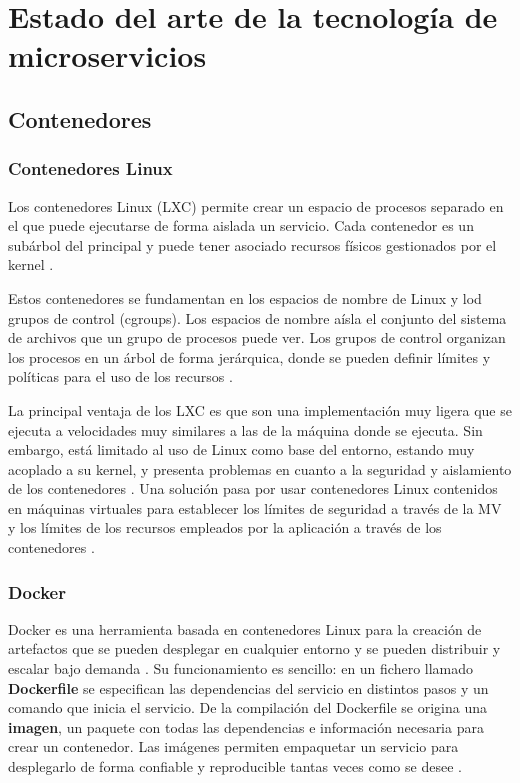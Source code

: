 \documentclass[11pt,spanish,listoffigures]{tfgetsinf}
\begin{document}
\chapter{Estado del arte de la tecnología de microservicios}

\section{Contenedores}

\subsection{Contenedores Linux}

Los contenedores Linux (LXC) permite crear un espacio de procesos separado en el que puede ejecutarse de forma aislada un servicio. Cada contenedor es un subárbol del principal y puede tener asociado recursos físicos gestionados por el kernel \cite{Newman2015a}.

Estos contenedores se fundamentan en los espacios de nombre de Linux y lod grupos de control (cgroups). Los espacios de nombre aísla el conjunto del sistema de archivos que un grupo de procesos puede ver. Los grupos de control organizan los procesos en un árbol de forma jerárquica, donde se pueden definir límites y políticas para el uso de los recursos \cite{Amaral2016}.

La principal ventaja de los LXC es que son una implementación muy ligera que se ejecuta a velocidades muy similares a las de la máquina donde se ejecuta. Sin embargo, está limitado al uso de Linux como base del entorno, estando muy acoplado a su kernel, y presenta problemas en cuanto a la seguridad y aislamiento de los contenedores \cite{Dua2014}. Una solución pasa por usar contenedores Linux contenidos en máquinas virtuales para establecer los límites de seguridad a través de la MV y los límites de los recursos empleados por la aplicación a través de los contenedores \cite{DeAlfonso2017}.

\subsection{Docker}

Docker es una herramienta basada en contenedores Linux para la creación de artefactos que se pueden desplegar en cualquier entorno y se pueden distribuir y escalar bajo demanda \cite{Matthias}. Su funcionamiento es sencillo: en un fichero llamado \textbf{Dockerfile} se especifican las dependencias del servicio en distintos pasos y un comando que inicia el servicio. De la compilación del Dockerfile se origina una \textbf{imagen}, un paquete con todas las dependencias e información necesaria para crear un contenedor. Las imágenes permiten empaquetar un servicio para desplegarlo de forma confiable y reproducible tantas veces como se desee \cite{DelaTorre2018}.
\end{document}
